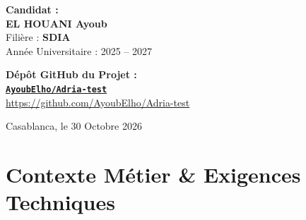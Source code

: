 \documentclass[11pt,a4paper]{report}
\begin{document}
\begin{titlepage}
\begin{center}
        \begin{minipage}{0.48\textwidth}
            \begin{flushleft} \large
                \textbf{Candidat :}\\
                \textbf{\color{primary}\Large EL HOUANI Ayoub}\\[0.2cm]
                Filière : \textbf{SDIA}\\
                Année Universitaire : 2025 -- 2027
            \end{flushleft}
        \end{minipage}
        \hfill
        \begin{minipage}{0.48\textwidth}
            \begin{flushright} \large
                \textbf{Dépôt GitHub du Projet :}\\
                \href{https://github.com/AyoubElho/Adria-test}{\color{secondary}\textbf{\texttt{AyoubElho/Adria-test}}}\\[0.2cm]
                \small\url{https://github.com/AyoubElho/Adria-test}
            \end{flushright}
        \end{minipage}

        \vfill
        {\small Casablanca, le 30 Octobre 2026}
    \end{center}
\end{titlepage}

\tableofcontents
\newpage

\chapter{Contexte Métier \& Exigences Techniques}
\end{document}
